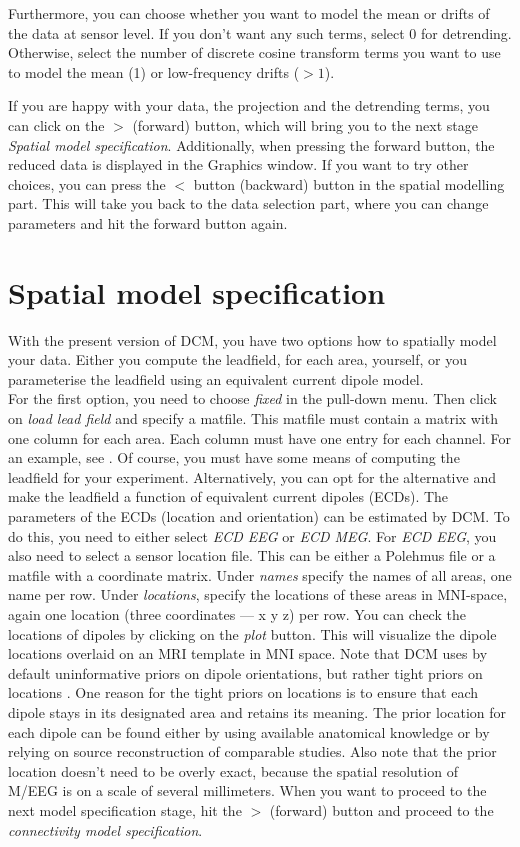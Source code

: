Furthermore, you can choose whether you want to model the mean or
drifts of the data at sensor level. If you don't want any such terms,
select 0 for detrending. Otherwise, select the number of discrete cosine
transform terms you want to use to model the mean (1) or low-frequency
drifts ($> 1$).

If you are happy with your data, the projection and the detrending
terms, you can click on the $>$ (forward) button, which will bring you to
the next stage \textit{Spatial model specification}. Additionally,
when pressing the forward button, the reduced data is displayed in the
Graphics window. If you want to try other choices, you can press
the $<$ button (backward) button in the spatial modelling
part. This will take you back to the data selection part, where you
can change parameters and hit the forward button again.

\section{Spatial model specification}
With the present version of DCM, you have two options how to spatially
model your data. Either you compute the leadfield, for each area,
yourself, or you parameterise the leadfield using an equivalent
current dipole model.\\

For the first option, you need to choose
\textit{fixed} in the pull-down menu. Then click on \textit{load lead
field} and specify a matfile. This matfile must contain a matrix with
one column for each area. Each column must have one entry for each
channel. For an example, see \cite{od_dcm_erp}. Of course, you must have some
means of computing the leadfield for your experiment. Alternatively,
you can opt for the alternative and make the leadfield a function of
equivalent current dipoles (ECDs). The parameters of the ECDs
(location and orientation) can be estimated by DCM. To do this, you
need to either select \textit{ECD EEG} or \textit{ECD MEG}. For
\textit{ECD EEG}, you also need to select a sensor location file. This
can be either a Polehmus file or a matfile with a coordinate
matrix. Under \textit{names} specify the names of all areas, one name
per row. Under \textit{locations}, specify the locations of these
areas in MNI-space, again one location (three coordinates --- x y z) per
row. You can check the locations of dipoles by clicking on the
\textit{plot} button. This will visualize the dipole locations
overlaid on an MRI template in MNI space. Note that DCM uses by
default uninformative priors on 
dipole orientations, but rather tight priors on locations
\cite{sjk_dcm_erp}. One reason for the tight priors on locations is to
ensure that 
each dipole stays in its designated area and retains its meaning. The
prior location for each dipole can be found either by using available
anatomical knowledge or by relying on source reconstruction of
comparable studies. Also note that the prior location doesn't need to
be overly exact, because the spatial resolution of M/EEG is on a scale
of several millimeters. When you want to proceed to the next model
specification stage, hit the $>$ (forward) button and proceed
to the \textit{connectivity model specification}.


